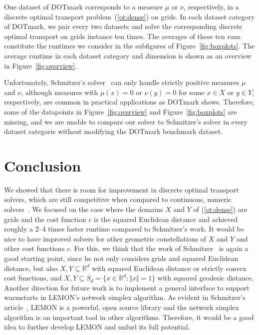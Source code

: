 \documentclass[a4paper,UKenglish,cleveref, autoref, thm-restate]{lipics-v2021}
\begin{document}
One dataset of DOTmark corresponds to a measure $\mu$ or $\nu$, respectively, in a discrete optimal transport problem~(\ref{ot:dense}) on grids.
In each dataset category of DOTmark, we pair every two datasets and solve the corresponding discrete optimal transport on grids instance ten times.
The averages of these ten runs constitute the runtimes we consider in the subfigures of Figure~\ref{fig:boxplots}.
The average runtime in each dataset category and dimension is shown as an overview in Figure~\ref{fig:overview}.

Unfortunately, Schmitzer's solver~\cite{schmitzer2016sparse} can only handle strictly positive measures $\mu$ and $\nu$, although measures with $\mu(x)=0$ or $\nu(y)=0$ for some $x \in X$ or $y \in Y$, respectively, are common in practical applications as DOTmark shows.
Therefore, some of the datapoints in Figure~\ref{fig:overview} and Figure~\ref{fig:boxplots} are missing, and we are unable to compare our solver to Schmitzer's solver in every dataset categorie without modifying the DOTmark benchmark dataset.

\section{Conclusion}
We showed that there is room for improvement in discrete optimal transport solvers, which are still competitive when compared to continuous, numeric solvers~\cite{schrieber2017dotmark}.
We focused on the case where the domains $X$ and $Y$ of (\ref{ot:dense}) are grids and the cost function $c$ is the squared Euclidean distance and achieved roughly a 2--4 times faster runtime compared to Schmitzer's work.
It would be nice to have improved solvers for other geometric constellations of $X$ and $Y$ and other cost functions $c$.
For this, we think that the work of Schmitzer~\cite{schmitzer2016sparse} is again a good starting point, since he not only considers grids and squared Euclidean distance, but also $X,Y \subseteq \mathbb{R}^d$ with squared Euclidean distance or strictly convex cost functions, and $X,Y \subseteq S_d = \{x \in \mathbb{R}^d: \Vert x \Vert = 1\}$ with squared geodesic distance.
Another direction for future work is to implement a general interface to support warmstarts in LEMON's network simplex algorithm.
As evident in Schmitzer's article~\cite{schmitzer2016sparse}, LEMON is a powerful, open source library and the network simplex algorithm is an important tool in other algorithms.
Therefore, it would be a good idea to further develop LEMON and unfurl its full potential.
\end{document}
